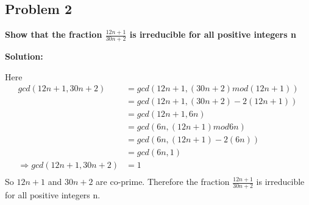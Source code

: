 \subsection{Problem 2}
\textbf{Show that the fraction $ \frac{12n+1}{30n+2}$ is irreducible for all positive integers n}
\par

\begin{flushleft}
    \textbf{Solution: }
    \par
    Here
    $$
    \begin{aligned}
        gcd(12n+1,30n+2) &= gcd(12n+1, (30n+2) mod (12n+1))\\
        & = gcd(12n+1, (30n+2) - 2(12n+1))\\
        & = gcd(12n+1, 6n)\\
        & = gcd(6n, (12n+1) mod 6n)\\
        & = gcd(6n, (12n+1) - 2(6n))\\
        & = gcd(6n, 1)\\
        \Rightarrow gcd(12n+1,30n+2) & = 1  \\
    \end{aligned}
    $$
So $12n+1$ and $30n+2$ are co-prime. Therefore the fraction $\frac{12n+1}{30n+2}$ is irreducible for all positive integers n.
\end{flushleft}